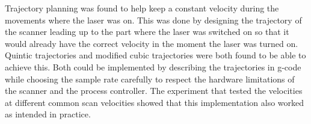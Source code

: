 Trajectory planning was found to help keep a constant velocity during the movements where the laser was on. This was done by designing the trajectory of the scanner leading up to the part where the laser was switched on so that it would already have the correct velocity in the moment the laser was turned on. Quintic trajectories and modified cubic trajectories were both found to be able to achieve this. Both could be implemented by describing the trajectories in g-code while choosing the sample rate carefully to respect the hardware limitations of the scanner and the process controller. The experiment that tested the velocities at different common scan velocities showed that this implementation also worked as intended in practice.
